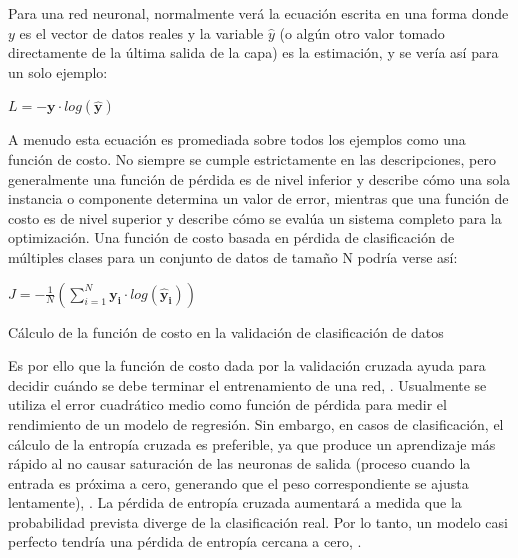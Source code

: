 		Para una red neuronal, normalmente verá la ecuación escrita en una forma donde $y$ es el vector de datos reales y la variable $\hat{y}$ (o algún otro valor tomado directamente de la última salida de la capa) es la estimación, y se vería así para un solo ejemplo:
			
			\begingroup\makeatletter{}\check@mathfonts
			\begin{center}
			$L = - \mathbf{y} \cdot log(\mathbf{\hat{y}})$
			\end{center}
			\endgroup		
		
		A menudo esta ecuación es promediada sobre todos los ejemplos como una función de costo. No siempre se cumple estrictamente en las descripciones, pero generalmente una función de pérdida es de nivel inferior y describe cómo una sola instancia o componente determina un valor de error, mientras que una función de costo es de nivel superior y describe cómo se evalúa un sistema completo para la optimización. Una función de costo basada en pérdida de clasificación de múltiples clases para un conjunto de datos de tamaño N podría verse así:
		
			\begingroup\makeatletter{}\check@mathfonts
			\begin{center}
			$J = - \frac{1}{N}(\sum_{i=1}^{N} \mathbf{y_i} \cdot log(\mathbf{\hat{y}_i}))$
			\end{center}
			\begin{center}
			{\small{Cálculo de la función de costo en la validación de clasificación de datos}}
			\end{center}
			\endgroup		
	

		Es por ello que la función de costo dada por la validación cruzada ayuda para decidir cuándo se debe terminar el entrenamiento de una red, \citep{AulaMLP}. Usualmente se utiliza el error cuadrático medio como función de pérdida para medir el rendimiento de un modelo de regresión. Sin embargo, en casos de clasificación, el cálculo de la entropía cruzada es preferible, ya que produce un aprendizaje más rápido al no causar saturación de las neuronas de salida (proceso cuando la entrada es próxima a cero, generando que el peso correspondiente se ajusta lentamente),  \citep{AulaDNN}. La pérdida de entropía cruzada aumentará a medida que la probabilidad prevista diverge de la clasificación real. Por lo tanto, un modelo casi perfecto tendría una pérdida de entropía cercana a cero, \citep{crossMSE}.
		


